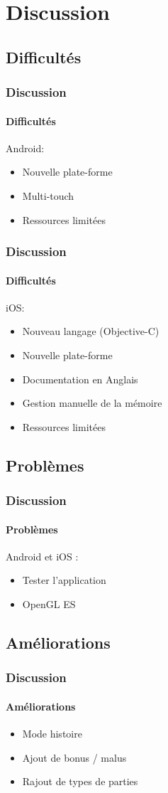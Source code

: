 \section{Discussion}

	\subsection{Difficultés}
		\begin{frame}
			\frametitle{Discussion}
			\framesubtitle{Difficultés}
			Android:
			\begin{itemize}
				\item Nouvelle plate-forme
				\item Multi-touch
				\item Ressources limitées
			\end{itemize}
		\end{frame}

		\begin{frame}
			\frametitle{Discussion}
			\framesubtitle{Difficultés}
			iOS:
			\begin{itemize}
				\item Nouveau langage (Objective-C)
				\item Nouvelle plate-forme
				\item Documentation en Anglais
				\item Gestion manuelle de la mémoire
				\item Ressources limitées
			\end{itemize}
		\end{frame}
		
		
	\subsection{Problèmes}
		\begin{frame}
			\frametitle{Discussion}
			\framesubtitle{Problèmes}
			Android et iOS :
			\begin{itemize}
				\item Tester l'application
				\item OpenGL ES
			\end{itemize}
		\end{frame}
		
		
	\subsection{Améliorations}
		\begin{frame}
			\frametitle{Discussion}
			\framesubtitle{Améliorations}
			\begin{itemize}
				\item Mode histoire
				\item Ajout de bonus / malus
				\item Rajout de types de parties
			\end{itemize}
		\end{frame}
